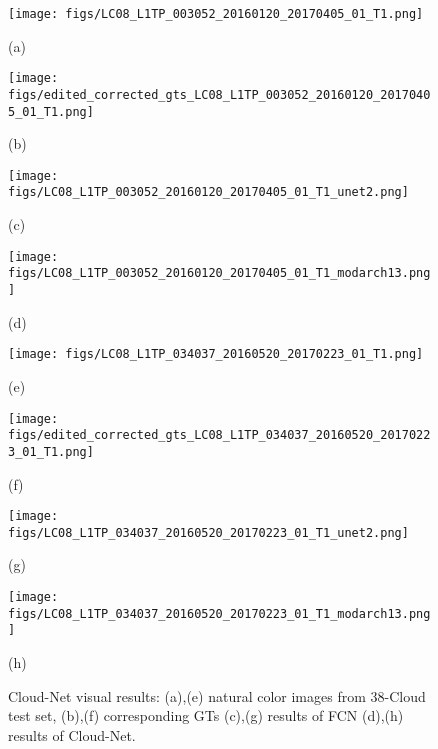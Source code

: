 \documentclass{article}
\begin{document}
\begin{figure}[htb]
\centering
\begin{minipage}{0.2\textwidth}
\centering
\centerline{\texttt{[image: figs/LC08\_L1TP\_003052\_20160120\_20170405\_01\_T1.png]}}\footnotesize{(a)}
\end{minipage}
\vspace{1mm}
\hspace{5mm}
\begin{minipage}{0.2\textwidth}
\centering
\centerline{\texttt{[image: figs/edited\_corrected\_gts\_LC08\_L1TP\_003052\_20160120\_20170405\_01\_T1.png]}}\footnotesize{(b)}
\end{minipage}
\begin{minipage}{0.2\textwidth}
\centering
\centerline{\texttt{[image: figs/LC08\_L1TP\_003052\_20160120\_20170405\_01\_T1\_unet2.png]}}
\footnotesize{(c)}
\end{minipage}
\vspace{1mm}
\hspace{5mm}
\begin{minipage}{0.2\textwidth}
\centering
\centerline{\texttt{[image: figs/LC08\_L1TP\_003052\_20160120\_20170405\_01\_T1\_modarch13.png]}}
\footnotesize{(d)}
\end{minipage}
\begin{minipage}{0.2\textwidth}
\centering
\centerline{\texttt{[image: figs/LC08\_L1TP\_034037\_20160520\_20170223\_01\_T1.png]}}\footnotesize{(e)}
\end{minipage}
\vspace{1mm}
\hspace{5mm}
\begin{minipage}{0.2\textwidth}
\centering
\centerline{\texttt{[image: figs/edited\_corrected\_gts\_LC08\_L1TP\_034037\_20160520\_20170223\_01\_T1.png]}}\footnotesize{(f)}
\end{minipage}
\begin{minipage}{0.2\textwidth}
\centering
\centerline{\texttt{[image: figs/LC08\_L1TP\_034037\_20160520\_20170223\_01\_T1\_unet2.png]}}
\footnotesize{(g)}
\end{minipage}
\vspace{1mm}
\hspace{5mm}
\begin{minipage}{0.2\textwidth}
\centering
\centerline{\texttt{[image: figs/LC08\_L1TP\_034037\_20160520\_20170223\_01\_T1\_modarch13.png]}}
\footnotesize{(h)}
\end{minipage}
\hspace{-1mm}  
\setlength{\abovecaptionskip}{2mm}
\caption{\footnotesize Cloud-Net visual results: (a),(e) natural color images from 38-Cloud test set, (b),(f) corresponding GTs (c),(g) results of FCN \cite{mymmsp} (d),(h) results of Cloud-Net.\label{Fig:samples}}
\end{figure}
\end{document}
